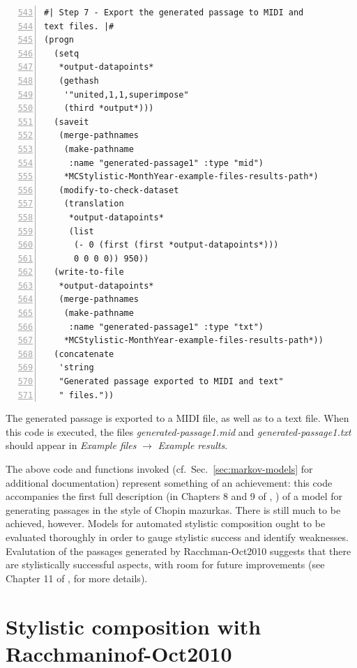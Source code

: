 \begin{Verbatim}[frame=single,numbers=left,firstnumber=543]
#| Step 7 - Export the generated passage to MIDI and
text files. |#
(progn
  (setq
   *output-datapoints*
   (gethash
    '"united,1,1,superimpose"
    (third *output*)))
  (saveit
   (merge-pathnames
    (make-pathname
     :name "generated-passage1" :type "mid")
    *MCStylistic-MonthYear-example-files-results-path*)
   (modify-to-check-dataset
    (translation
     *output-datapoints*
     (list
      (- 0 (first (first *output-datapoints*)))
      0 0 0 0)) 950))
  (write-to-file
   *output-datapoints*
   (merge-pathnames
    (make-pathname
     :name "generated-passage1" :type "txt")
    *MCStylistic-MonthYear-example-files-results-path*))
  (concatenate
   'string
   "Generated passage exported to MIDI and text"
   " files."))
\end{Verbatim}
The generated passage is exported to a MIDI file, as well as to a text file. When this code is executed, the files \emph{generated-passage1.mid} and \emph{generated-passage1.txt} should appear in \emph{Example files} $\rightarrow$ \emph{Example results}.

The above code and functions invoked (cf.~Sec.~\ref{sec:markov-models} for additional documentation) represent something of an achievement: this code accompanies the first full description (in Chapters 8 and 9 of \citeauthor{collins2011b}, \citeyear{collins2011b}) of a model for generating passages in the style of Chopin mazurkas. There is still much to be achieved, however. Models for automated stylistic composition ought to be evaluated thoroughly in order to gauge stylistic success and identify weaknesses. Evalutation of the passages generated by Racchman-Oct2010 suggests that there are stylistically successful aspects, with room for future improvements (see Chapter 11 of \citeauthor{collins2011b}, \citeyear{collins2011b} for more details).


\section[Stylistic composition with Racchmaninof-Oct2010]{Stylistic composition with\\ Racchmaninof-Oct2010}\label{sec:ex:Racchmaninof-Oct2010}

